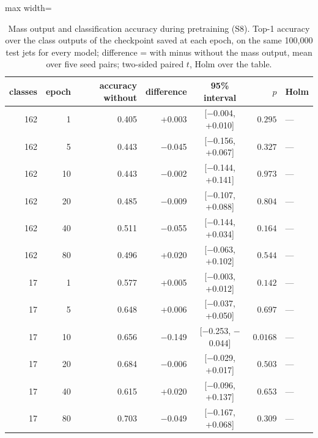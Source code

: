 \begin{table}[t]
\centering
\small
\setlength{\tabcolsep}{4pt}
\caption{Mass output and classification accuracy during pretraining (S8). Top-1 accuracy over the class outputs of the checkpoint saved at each epoch, on the same 100{,}000 test jets for every model; difference = with minus without the mass output, mean over five seed pairs; two-sided paired $t$, Holm over the table.}
\label{tab:s8}
\begin{adjustbox}{max width=\linewidth}
\begin{tabular}{r r r r c r l}
\toprule
classes & epoch & accuracy without & difference & 95\% interval & $p$ & Holm \\
\midrule
162 & 1 & 0.405 & +0.003 & [$-$0.004, +0.010] & $0.295$ & --- \\
162 & 5 & 0.443 & $-$0.045 & [$-$0.156, +0.067] & $0.327$ & --- \\
162 & 10 & 0.443 & $-$0.002 & [$-$0.144, +0.141] & $0.973$ & --- \\
162 & 20 & 0.485 & $-$0.009 & [$-$0.107, +0.088] & $0.804$ & --- \\
162 & 40 & 0.511 & $-$0.055 & [$-$0.144, +0.034] & $0.164$ & --- \\
162 & 80 & 0.496 & +0.020 & [$-$0.063, +0.102] & $0.544$ & --- \\
17 & 1 & 0.577 & +0.005 & [$-$0.003, +0.012] & $0.142$ & --- \\
17 & 5 & 0.648 & +0.006 & [$-$0.037, +0.050] & $0.697$ & --- \\
17 & 10 & 0.656 & $-$0.149 & [$-$0.253, $-$0.044] & $0.0168$ & --- \\
17 & 20 & 0.684 & $-$0.006 & [$-$0.029, +0.017] & $0.503$ & --- \\
17 & 40 & 0.615 & +0.020 & [$-$0.096, +0.137] & $0.653$ & --- \\
17 & 80 & 0.703 & $-$0.049 & [$-$0.167, +0.068] & $0.309$ & --- \\
\bottomrule
\end{tabular}
\end{adjustbox}
\end{table}
